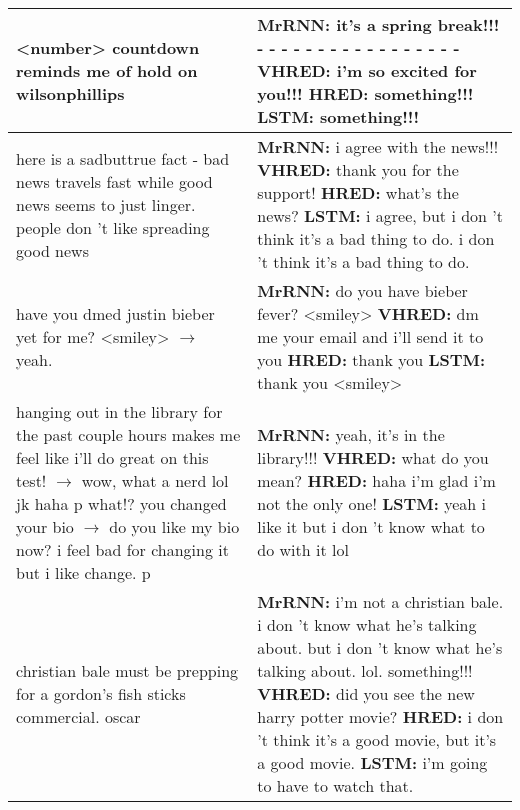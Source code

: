 \documentclass{article}
\begin{document}
\begin{table}[ht]
\begin{tabular}{p{45mm}|p{80mm}}
     <number> countdown reminds me of hold on wilsonphillips & \textbf{MrRNN:} it's a spring break!!! - - - - - - - - - - - - - - - - -  \newline \textbf{VHRED:} i'm so excited for you!!! \newline \textbf{HRED:} something!!! \newline \textbf{LSTM:} something!!!  \\ \hline 
     here is a sadbuttrue fact - bad news travels fast while good news seems to just linger. people don 't like spreading good news & \textbf{MrRNN:} i agree with the news!!!  \newline \textbf{VHRED:} thank you for the support! \newline \textbf{HRED:} what's the news? \newline \textbf{LSTM:} i agree, but i don 't think it's a bad thing to do. i don 't think it's a bad thing to do.  \\ \hline 
     have you dmed justin bieber yet for me? <smiley> $\rightarrow$ yeah. & \textbf{MrRNN:} do you have bieber fever? <smiley>  \newline \textbf{VHRED:} dm me your email and i'll send it to you \newline \textbf{HRED:} thank you \newline \textbf{LSTM:} thank you <smiley>  \\ \hline 
     hanging out in the library for the past couple hours makes me feel like i'll do great on this test! $\rightarrow$ wow, what a nerd lol jk haha p what!? you changed your bio $\rightarrow$ do you like my bio now? i feel bad for changing it but i like change. p & \textbf{MrRNN:} yeah, it's in the library!!!  \newline \textbf{VHRED:} what do you mean? \newline \textbf{HRED:} haha i'm glad i'm not the only one! \newline \textbf{LSTM:} yeah i like it but i don 't know what to do with it lol  \\ \hline 
     christian bale must be prepping for a gordon's fish sticks commercial. oscar & \textbf{MrRNN:} i'm not a christian bale. i don 't know what he's talking about. but i don 't know what he's talking about. lol. something!!!  \newline \textbf{VHRED:} did you see the new harry potter movie? \newline \textbf{HRED:} i don 't think it's a good movie, but it's a good movie. \newline \textbf{LSTM:} i'm going to have to watch that.  \\ \hline 

\end{tabular}
\end{table}
\end{document}

